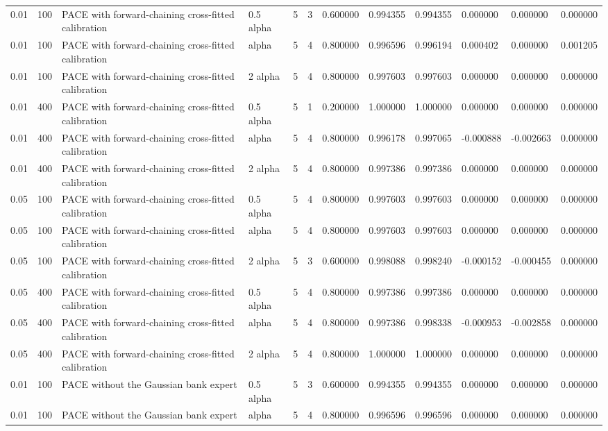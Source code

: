 \begin{tabular}{llllllllllll}
0.01 & 100 & PACE with forward-chaining cross-fitted calibration & 0.5 alpha & 5 & 3 & 0.600000 & 0.994355 & 0.994355 & 0.000000 & 0.000000 & 0.000000 \\
0.01 & 100 & PACE with forward-chaining cross-fitted calibration & alpha & 5 & 4 & 0.800000 & 0.996596 & 0.996194 & 0.000402 & 0.000000 & 0.001205 \\
0.01 & 100 & PACE with forward-chaining cross-fitted calibration & 2 alpha & 5 & 4 & 0.800000 & 0.997603 & 0.997603 & 0.000000 & 0.000000 & 0.000000 \\
0.01 & 400 & PACE with forward-chaining cross-fitted calibration & 0.5 alpha & 5 & 1 & 0.200000 & 1.000000 & 1.000000 & 0.000000 & 0.000000 & 0.000000 \\
0.01 & 400 & PACE with forward-chaining cross-fitted calibration & alpha & 5 & 4 & 0.800000 & 0.996178 & 0.997065 & -0.000888 & -0.002663 & 0.000000 \\
0.01 & 400 & PACE with forward-chaining cross-fitted calibration & 2 alpha & 5 & 4 & 0.800000 & 0.997386 & 0.997386 & 0.000000 & 0.000000 & 0.000000 \\
0.05 & 100 & PACE with forward-chaining cross-fitted calibration & 0.5 alpha & 5 & 4 & 0.800000 & 0.997603 & 0.997603 & 0.000000 & 0.000000 & 0.000000 \\
0.05 & 100 & PACE with forward-chaining cross-fitted calibration & alpha & 5 & 4 & 0.800000 & 0.997603 & 0.997603 & 0.000000 & 0.000000 & 0.000000 \\
0.05 & 100 & PACE with forward-chaining cross-fitted calibration & 2 alpha & 5 & 3 & 0.600000 & 0.998088 & 0.998240 & -0.000152 & -0.000455 & 0.000000 \\
0.05 & 400 & PACE with forward-chaining cross-fitted calibration & 0.5 alpha & 5 & 4 & 0.800000 & 0.997386 & 0.997386 & 0.000000 & 0.000000 & 0.000000 \\
0.05 & 400 & PACE with forward-chaining cross-fitted calibration & alpha & 5 & 4 & 0.800000 & 0.997386 & 0.998338 & -0.000953 & -0.002858 & 0.000000 \\
0.05 & 400 & PACE with forward-chaining cross-fitted calibration & 2 alpha & 5 & 4 & 0.800000 & 1.000000 & 1.000000 & 0.000000 & 0.000000 & 0.000000 \\
0.01 & 100 & PACE without the Gaussian bank expert & 0.5 alpha & 5 & 3 & 0.600000 & 0.994355 & 0.994355 & 0.000000 & 0.000000 & 0.000000 \\
0.01 & 100 & PACE without the Gaussian bank expert & alpha & 5 & 4 & 0.800000 & 0.996596 & 0.996596 & 0.000000 & 0.000000 & 0.000000 \\

\end{tabular}
